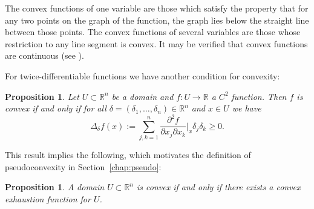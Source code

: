 \documentclass[11pt,a4paper, final, twoside]{article}
\newtheorem{proposition}[theorem]{Proposition}
\numberwithin{equation}{section}
\newcommand{\R}{\mathbb R}
\newcommand{\cts}{C}
\begin{document}
The convex functions of one variable are those which satisfy the property that for any two points on the graph of the function, the graph lies below
the straight line between those points.
The convex functions of several variables are those whose restriction to any line segment is convex. 
It may be verified that convex functions are continuous (see \cite[page 85]{vlad}). 

For twice-differentiable functions we have another condition for convexity:
\begin{proposition}
\label{convexdiff}
Let $U\subset\R^n$ be a domain and $f\colon U\to\R$ a $\cts^2$ function. Then $f$ is convex if and only if for all $\delta=(\delta_1,\dots,\delta_n)\in\R^n$ and $x\in U$ we have
$$ \Delta_\delta f(x):= \sum_{j,k=1}^n \frac{\partial^2 f}{\partial x_j\partial x_k}\bigg|_x\delta_j\delta_k\geq 0.$$
\end{proposition}
This result implies the following, which
motivates the definition of pseudoconvexity in Section~\ref{chap:pseudo}:
\begin{proposition}
\label{convexex}
A domain $U\subset\R^n$ is convex if and only if there exists a convex exhaustion function for $U$.
\end{proposition}
\end{document}
